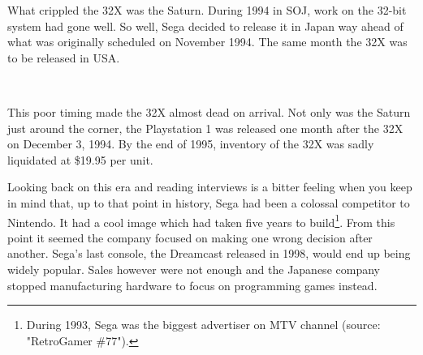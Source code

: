 What crippled the 32X was the Saturn. During 1994 in SOJ, work on the 32-bit system had gone well. So well, Sega decided to release it in Japan way ahead of what was originally scheduled on November 1994. The same month the 32X was to be released in USA.\\

\par

\\
 \par This poor timing made the 32X almost dead on arrival. Not only was the Saturn just around the corner, the  Playstation 1 was released one month after the 32X on December 3, 1994. By the end of 1995, inventory of the 32X was sadly liquidated at \$19.95 per unit.\\
\par
Looking back on this era and reading interviews is a bitter feeling when you keep in mind that, up to that point in history, Sega had been a colossal competitor to Nintendo. It had a cool image which had taken five years to build\footnote{During 1993, Sega was the biggest advertiser on MTV channel (source: "RetroGamer \#77").}. From this point it seemed the company focused on making one wrong decision after another. Sega's last console, the Dreamcast released in 1998, would end up being widely popular. Sales however were not enough and the Japanese company stopped manufacturing hardware to focus on programming games instead.\\ 





